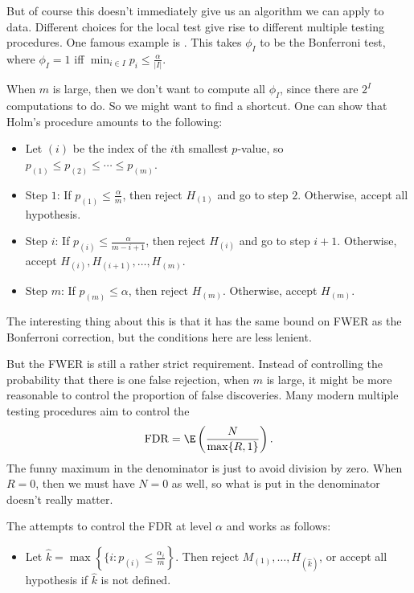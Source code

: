 \documentclass[a4paper]{article}
\begin{document}
But of course this doesn't immediately give us an algorithm we can apply to data. Different choices for the local test give rise to different multiple testing procedures. One famous example is . This takes $\phi_I$ to be the Bonferroni test, where $\phi_I = 1$ iff $\min_{i \in I} p_i \leq \frac{\alpha}{|I|}$.

When $m$ is large, then we don't want to compute all $\phi_I$, since there are $2^I$ computations to do. So we might want to find a shortcut. One can show that Holm's procedure amounts to the following:
\begin{itemize}
  \item Let $(i)$ be the index of the $i$th smallest $p$-value, so $p_{(1)} \leq p_{(2)} \leq \cdots \leq p_{(m)}$.
  \item Step $1$: If $p_{(1)} \leq \frac{\alpha}{m}$, then reject $H_{(1)}$ and go to step $2$. Otherwise, accept all hypothesis.
  \item Step $i$: If $p_{(i)} \leq \frac{\alpha}{m - i + 1}$, then reject $H_{(i)}$ and go to step $i + 1$. Otherwise, accept $H_{(i)}, H_{(i + 1)}, \ldots, H_{(m)}$.
  \item Step $m$: If $p_{(m)} \leq \alpha$, then reject $H_{(m)}$. Otherwise, accept $H_{(m)}$.
\end{itemize}
The interesting thing about this is that it has the same bound on FWER as the Bonferroni correction, but the conditions here are less lenient.

But the FWER is still a rather strict requirement. Instead of controlling the probability that there is one false rejection, when $m$ is large, it might be more reasonable to control the proportion of false discoveries. Many modern multiple testing procedures aim to control the 
\[
  \mathrm{FDR} = \E\left(\frac{N}{\max \{R, 1\}}\right).
\]
The funny maximum in the denominator is just to avoid division by zero. When $R = 0$, then we must have $N = 0$ as well, so what is put in the denominator doesn't really matter.

The  attempts to control the FDR at level $\alpha$ and works as follows:
\begin{itemize}
  \item Let $\hat{k} = \max \left\{\{i: p_{(i)} \leq \frac{\alpha_i}{m}\right\}$. Then reject $M_{(1)}, \ldots, H_{(\hat{k})}$, or accept all hypothesis if $\hat{k}$ is not defined.
\end{itemize}
\end{document}
